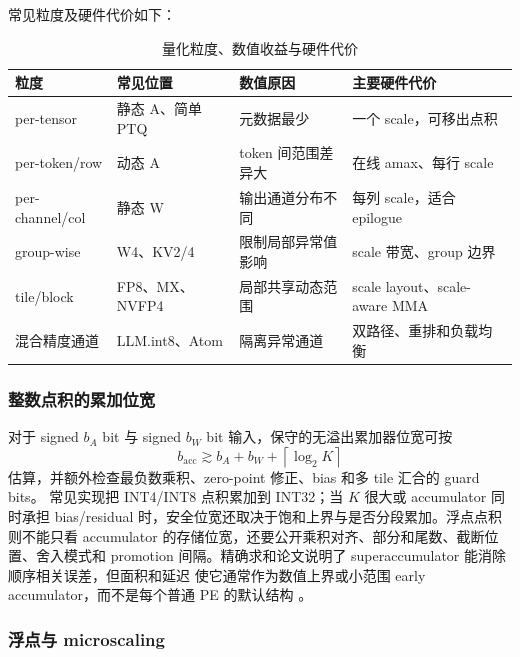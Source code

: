 常见粒度及硬件代价如下：
\begin{table}[H]
  \centering
  \small
  \caption{量化粒度、数值收益与硬件代价}
  \label{tab:quant-granularity-hw}
  \begin{tabular}{p{2.7cm}p{4.0cm}p{4.0cm}p{3.0cm}}
    \toprule
    粒度 & 常见位置 & 数值原因 & 主要硬件代价 \\
    \midrule
    per-tensor & 静态 A、简单 PTQ & 元数据最少 & 一个 scale，可移出点积 \\
    per-token/row & 动态 A & token 间范围差异大 & 在线 amax、每行 scale \\
    per-channel/col & 静态 W & 输出通道分布不同 & 每列 scale，适合 epilogue \\
    group-wise & W4、KV2/4 & 限制局部异常值影响 & scale 带宽、group 边界 \\
    tile/block & FP8、MX、NVFP4 & 局部共享动态范围 & scale layout、scale-aware MMA \\
    混合精度通道 & LLM.int8、Atom & 隔离异常通道 & 双路径、重排和负载均衡 \\
    \bottomrule
  \end{tabular}
\end{table}

\subsubsection{整数点积的累加位宽}

对于 signed $b_A$ bit 与 signed $b_W$ bit 输入，保守的无溢出累加器位宽可按
\begin{equation}
  b_{\mathrm{acc}}
  \gtrsim b_A+b_W+\left\lceil\log_2K\right\rceil
  \label{eq:int-acc-width}
\end{equation}
估算，并额外检查最负数乘积、zero-point 修正、bias 和多 tile 汇合的 guard bits。
常见实现把 INT4/INT8 点积累加到 INT32；当 $K$ 很大或 accumulator 同时承担
bias/residual 时，安全位宽还取决于饱和上界与是否分段累加。浮点点积则不能只看 accumulator
的存储位宽，还要公开乘积对齐、部分和尾数、截断位置、舍入模式和 promotion
间隔。精确求和论文说明了 superaccumulator 能消除顺序相关误差，但面积和延迟
使它通常作为数值上界或小范围 early accumulator，而不是每个普通 PE 的默认结构
。

\subsubsection{浮点与 microscaling}

